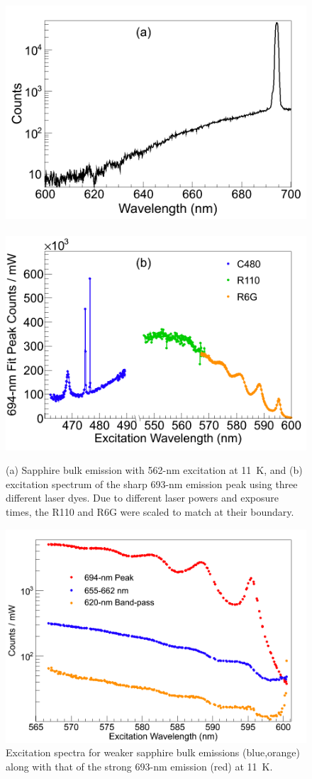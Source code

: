 
\begin{figure} %
        \centering
                \includegraphics[width=.5\textwidth]{figures/Cr_a.png}
                ~
                \includegraphics[width=.5\textwidth]{figures/Cr_b.png}
                \caption{(a) Sapphire bulk emission with 562-nm excitation at 11~K, and (b) excitation spectrum of the sharp 693-nm emission peak using three different laser dyes.  Due to different laser powers and exposure times, the R110 and R6G were scaled to match at their boundary.}
\label{fig:Cr}
\end{figure}

\begin{figure} %
        \centering
                \includegraphics[width=.7\textwidth]{figures/Cr_broad.png}
                \caption{Excitation spectra for weaker sapphire bulk emissions (blue,orange) along with that of the strong 693-nm emission (red) at 11~K.}
        \label{fig:CrBroad}
\end{figure}

